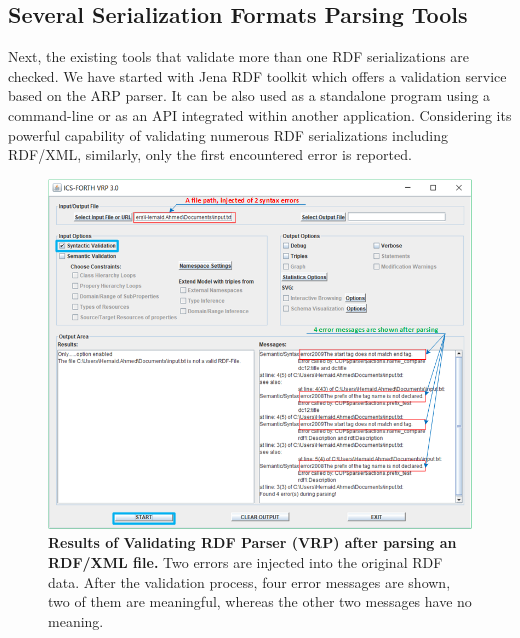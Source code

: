 \subsection{Several Serialization Formats Parsing Tools}

\par Next, the existing tools that validate more than one RDF serializations are checked. 
We have started with Jena RDF toolkit \cite{McBride:2002:JSW:613357.613755} which offers a validation service based on the ARP parser. 
It can be also used as a standalone program using a command-line or as an API integrated within another application.
Considering its powerful capability of validating numerous RDF serializations including RDF/XML, similarly, only the first encountered error is reported.

 \begin{figure}[ht]
		\begin{center}
			\includegraphics[scale=0.7,angle=0]{images/VRPErrorResult.png}
			\caption{\textbf{Results of Validating RDF Parser (VRP) \cite{karsten:Thesis:2000} after parsing an RDF/XML file.} Two errors are injected into the original RDF data. After the validation process, four error messages are shown, two of them are meaningful, whereas the other two messages have no meaning.}
			\label{Fig:VRPErrorResult}
		\end{center}
	\end{figure}
	
\vspace*{-\baselineskip}

